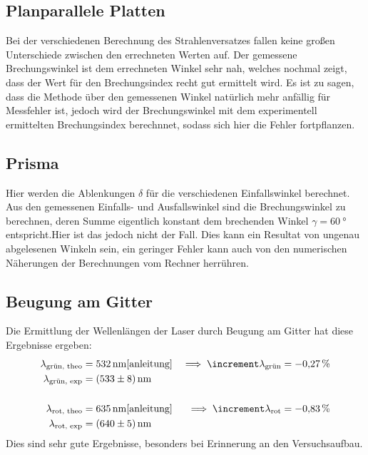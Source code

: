 \subsection{Planparallele Platten}

  Bei der verschiedenen Berechnung des Strahlenversatzes fallen keine großen Unterschiede zwischen den errechneten Werten auf. Der gemessene Brechungswinkel ist dem
  errechneten Winkel sehr nah, welches nochmal zeigt, dass der Wert für den Brechungsindex recht gut ermittelt wird. Es ist zu sagen, dass die Methode über den 
  gemessenen Winkel natürlich mehr anfällig für Messfehler ist, jedoch wird der Brechungswinkel mit dem experimentell ermittelten Brechungsindex berechnnet, 
  sodass sich hier die Fehler fortpflanzen.

\subsection{Prisma}

  Hier werden die Ablenkungen $\delta$ für die verschiedenen Einfallswinkel berechnet. Aus den gemessenen Einfalls- und Ausfallswinkel sind die Brechungswinkel 
  zu berechnen, deren Summe eigentlich konstant dem brechenden Winkel $\gamma = \SI{60}{\degree}$ entspricht.Hier ist das jedoch nicht der Fall. Dies kann 
  ein Resultat von ungenau abgelesenen Winkeln sein, ein geringer Fehler kann auch von den numerischen Näherungen der Berechnungen vom Rechner herrühren. 


\subsection{Beugung am Gitter}

  Die Ermittlung der Wellenlängen der Laser durch Beugung am Gitter hat diese Ergebnisse ergeben:
  \begin{align*}
    \lambda_{\text{grün, theo}} &= \SI{532}{\nano\metre} \text{\cite{anleitung}} & \implies \increment \lambda_{\text{grün}} &= \SI{-0.27}{\percent} \\
    \lambda_{\text{grün, exp}} &= \SI{533(8)}{\nano\metre}\\
    \\
    \lambda_{\text{rot, theo}} &= \SI{635}{\nano\metre} \text{\cite{anleitung}} & \implies \increment \lambda_{\text{rot}} &= \SI{-0.83}{\percent} \\
    \lambda_{\text{rot, exp}} &= \SI{640(5)}{\nano\metre}
  \end{align*}
  Dies sind sehr gute Ergebnisse, besonders bei Erinnerung an den Versuchsaufbau. 

